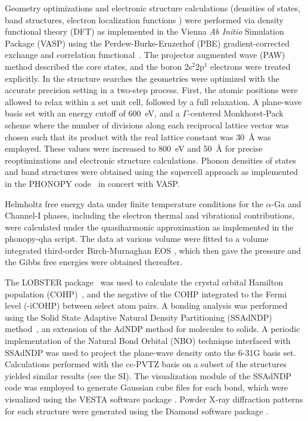 \documentclass[reprint,aps,prl,twocolumn,letterpaper]{revtex4-2}
\begin{document}
Geometry optimizations and electronic structure calculations (densities of states, band structures, electron localization functions \cite{ELF}) were performed via density functional theory (DFT) as implemented in the  Vienna \emph{Ab Initio} Simulation Package (VASP) \cite{kresse1996efficient,kresse1999ultrasoft} using the Perdew-Burke-Ernzerhof (PBE) gradient-corrected exchange and correlation functional~\cite{Perdew:1996}. The projector augmented wave (PAW) method \cite{blochl1994projector} described the core states, and the boron 2s$^{2}$2p$^{1}$ electrons were treated explicitly. In the structure searches the geometries were optimized with the accurate precision setting in a two-step process. First, the atomic positions were allowed to relax within a set unit cell, followed by a full relaxation. A plane-wave basis set with an energy cutoff of 600~eV, and a $\Gamma$-centered Monkhorst-Pack scheme \cite{monkhorst1976special} where the number of divisions along each reciprocal lattice vector was chosen such that its product with the real lattice constant was 30~\AA{} was employed. These values were increased to 800~eV and 50~\AA{} for precise reoptimizations and electronic structure calculations.
Phonon densities of states and band structures were obtained using the supercell approach as implemented in the PHONOPY code~\cite{Togo:2015} in concert with VASP. 

Helmholtz free energy data under finite temperature conditions for the $\alpha$-Ga and Channel-I phases, including the electron thermal and vibrational contributions, were calculated under the quasiharmonic approximation as implemented in the phonopy-qha script. The data at various volume were fitted to a volume integrated third-order Birch-Murnaghan EOS \cite{Birch:1952}, which then gave the pressure and the Gibbs free energies were obtained thereafter.

The LOBSTER package~\cite{Deringer:2011, Maintz:2016} was used to calculate the crystal orbital Hamilton population (COHP)~\cite{Dronskowski:1993}, and the negative of the COHP integrated to the Fermi level (-iCOHP) between select atom pairs. A bonding analysis was performed using the Solid State Adaptive Natural Density Partitioning (SSAdNDP) method~\cite{Galeev:2013}, an extension of the AdNDP method \cite{Zubarev:2008} for molecules to solids. A periodic implementation of the Natural Bond Orbital (NBO) technique \cite{NBO,Dunnington:2012} interfaced with SSAdNDP was used to project the plane-wave density onto the 6-31G basis set. Calculations performed with the cc-PVTZ basis \cite{Dunning:1989} on a subset of the structures yielded similar results (see the SI). The visualization module of the SSAdNDP code was employed to generate Gaussian cube files for each bond, which were visualized using the VESTA software package \cite{Momma:2011}. Powder X-ray diffraction patterns for each structure were generated using the Diamond software package \cite{diamond}. 
\end{document}
